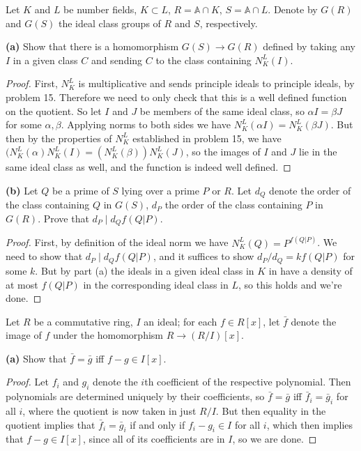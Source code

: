 \documentclass[11pt]{article}
\begin{document}
Let $K$ and $L$ be number fields, $K \subset L$, $R = \mathbb{A} \cap K$, $S = \mathbb{A} \cap L$. Denote by $G(R)$ and $G(S)$ the ideal class groups of $R$ and $S$, respectively.

\textbf{(a)} Show that there is a homomorphism $G(S) \rightarrow G(R)$ defined by taking any $I$ in a given class $C$ and sending $C$ to the class containing $N_K^L(I)$.

\begin{proof}
  First, $N_K^L$ is multiplicative and sends principle ideals to principle ideals, by problem 15.
  Therefore we need to only check that this is a well defined function on the quotient.
  So let $I$ and $J$ be members of the same ideal class, so $\alpha I = \beta J$ for some $\alpha, \beta$.
  Applying norms to both sides we have $N_K^L(\alpha I) = N_K^L(\beta J)$.
  But then by the properties of $N_K^L$ established in problem 15, we have $(N_K^L(\alpha) N_K^L(I) = (N_K^L(\beta)) N_K^L(J)$, so the images of $I$ and $J$ lie in the same ideal class as well, and the function is indeed well defined.
\end{proof}

\textbf{(b)} Let $Q$ be a prime of $S$ lying over a prime $P$ or $R$. Let $d_Q$ denote the order of the class containing $Q$ in $G(S)$, $d_P$ the order of the class containing $P$ in $G(R)$. Prove that $d_P \mid d_Q f(Q|P)$.

\begin{proof}
  First, by definition of the ideal norm we have $N_K^L(Q) = P^{f(Q|P)}$.
  We need to show that $d_P \mid d_Q f(Q|P)$, and it suffices to show $d_P/d_Q = k f(Q|P)$ for some $k$.
  But by part (a) the ideals in a given ideal class in $K$ in have a density of at most $f(Q|P)$ in the corresponding ideal class in $L$, so this holds and we're done.
\end{proof}


Let $R$ be a commutative ring, $I$ an ideal; for each $f \in R[x]$, let $\bar f$ denote the image of $f$ under the homomorphism $R \rightarrow (R/I)[x]$.

\textbf{(a)} Show that $\bar f = \bar g$ iff $f - g \in I[x]$.

\begin{proof}
  Let $f_i$ and $g_i$ denote the $i$th coefficient of the respective polynomial.
  Then polynomials are determined uniquely by their coefficients, so $\bar f = \bar g$ iff $\bar f_i = \bar g_i$ for all $i$, where the quotient is now taken in just $R/I$.
  But then equality in the quotient implies that $\bar f_i = \bar g_i$ if and only if $f_i - g_i \in I$ for all $i$, which then implies that $f - g \in I[x]$, since all of its coefficients are in $I$, so we are done.
\end{proof}
\end{document}
